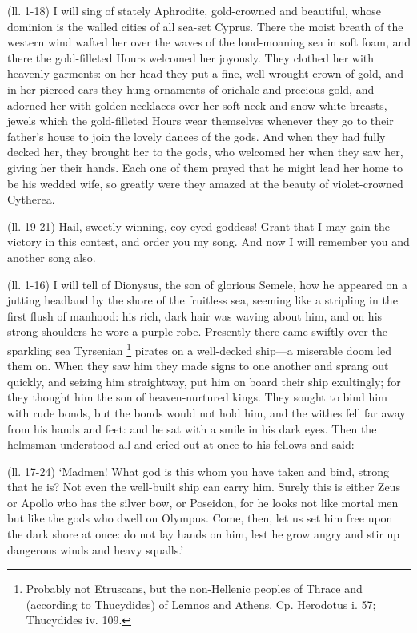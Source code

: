 
(ll. 1-18) I will sing of stately Aphrodite, gold-crowned and beautiful, whose
dominion is the walled cities of all sea-set Cyprus. There the moist breath of
the western wind wafted her over the waves of the loud-moaning sea in soft
foam, and there the gold-filleted Hours welcomed her joyously. They clothed her
with heavenly garments: on her head they put a fine, well-wrought crown of
gold, and in her pierced ears they hung ornaments of orichalc and precious
gold, and adorned her with golden necklaces over her soft neck and snow-white
breasts, jewels which the gold-filleted Hours wear themselves whenever they go
to their father’s house to join the lovely dances of the gods. And when
they had fully decked her, they brought her to the gods, who welcomed her when
they saw her, giving her their hands. Each one of them prayed that he might
lead her home to be his wedded wife, so greatly were they amazed at the beauty
of violet-crowned Cytherea.

(ll. 19-21) Hail, sweetly-winning, coy-eyed goddess! Grant that I may gain the
victory in this contest, and order you my song. And now I will remember you and
another song also.


(ll. 1-16) I will tell of Dionysus, the son of glorious Semele, how he appeared
on a jutting headland by the shore of the fruitless sea, seeming like a
stripling in the first flush of manhood: his rich, dark hair was waving about
him, and on his strong shoulders he wore a purple robe. Presently there came
swiftly over the sparkling sea Tyrsenian \footnote{Probably not Etruscans,
but the non-Hellenic peoples of Thrace and (according to Thucydides) of Lemnos
and Athens. Cp. Herodotus i. 57; Thucydides iv. 109.} pirates
on a well-decked ship—a miserable doom led them on. When they saw him
they made signs to one another and sprang out quickly, and seizing him
straightway, put him on board their ship exultingly; for they thought him the
son of heaven-nurtured kings. They sought to bind him with rude bonds, but the
bonds would not hold him, and the withes fell far away from his hands and feet:
and he sat with a smile in his dark eyes. Then the helmsman understood all and
cried out at once to his fellows and said:

(ll. 17-24) ‘Madmen! What god is this whom you have taken and bind,
strong that he is? Not even the well-built ship can carry him. Surely this is
either Zeus or Apollo who has the silver bow, or Poseidon, for he looks not
like mortal men but like the gods who dwell on Olympus. Come, then, let us set
him free upon the dark shore at once: do not lay hands on him, lest he grow
angry and stir up dangerous winds and heavy squalls.’

